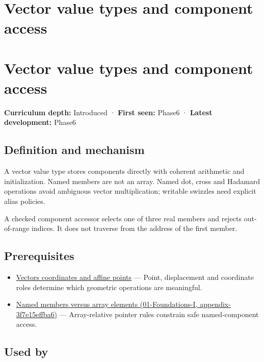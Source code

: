 \hypertarget{appendix-37a39984ba66}{}
\section*{Vector value types and component access}
\section{Vector value types and component access}\label{appendix-37a39984ba66-vector-value-types-and-component-access}

\textbf{Curriculum depth:} Introduced · \textbf{First seen:} Phase6 · \textbf{Latest development:} Phase6

\subsection{Definition and mechanism}\label{appendix-37a39984ba66-definition-and-mechanism}

A vector value type stores components directly with coherent arithmetic and initialization. Named members are not an array. Named dot, cross and Hadamard operations avoid ambiguous vector multiplication; writable swizzles need explicit alias policies.

A checked component accessor selects one of three real members and rejects out-of-range indices. It does not traverse from the address of the first member.

\subsection{Prerequisites}\label{appendix-37a39984ba66-prerequisites}

\begin{itemize}
\tightlist
\item
  \hyperref[appendix-0659864c0aa3]{Vectors coordinates and affine points} --- Point, displacement and coordinate roles determine which geometric operations are meaningful.
\item
  \href{../01-Foundations-I/main.pdf\#nameddest=appendix-3f7e15effba6}{Named members versus array elements (01-Foundations-I, appendix-3f7e15effba6)} --- Array-relative pointer rules constrain safe named-component access.
\end{itemize}

\subsection{Used by}\label{appendix-37a39984ba66-used-by}

